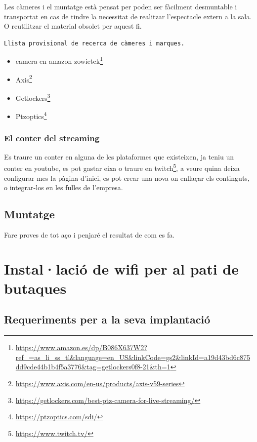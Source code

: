 \documentclass[
  10pt,
]{krantz}
\DeclareRobustCommand{\href}[2]{#2\footnote{\url{#1}}}
\begin{document}
Les càmeres i el muntatge està pensat per poden ser fàcilment desmuntable i transportat en cas de tindre la necessitat de realitzar l'espectacle extern a la sala. O reutilitzar el material obsolet per aquest fi.

\texttt{Llista\ provisional\ de\ recerca\ de\ càmeres\ i\ marques.}

\begin{itemize}
\item
  \href{https://www.amazon.es/dp/B086X637W2?ref_=as_li_ss_tl\&language=en_US\&linkCode=gs2\&linkId=a19d43bd6c875dd9cde44b1b4f5a3776\&tag=getlockers0f8-21\&th=1}{camera en amazon zowietek}
\item
  \href{https://www.axis.com/en-us/products/axis-v59-series}{Axis}
\item
  \href{https://getlockers.com/best-ptz-camera-for-live-streaming/}{Getlockers}
\item
  \href{https://ptzoptics.com/sdi/}{Ptzoptics}
\end{itemize}

\hypertarget{el-conter-del-streaming}{%
\subsection{El conter del streaming}\label{el-conter-del-streaming}}

Es traure un conter en alguna de les plataformes que existeixen, ja teniu un conter en youtube, es pot gastar eixa o traure en \href{https://www.twitch.tv/}{twitch}, a veure quina deixa configurar mes la pàgina d'inici, es pot crear una nova on enllaçar els continguts, o integrar-los en les fulles de l'empresa.

\hypertarget{muntatge}{%
\section{Muntatge}\label{muntatge}}

Fare proves de tot aço i penjaré el resultat de com es fa.

\hypertarget{installaciuxf3-de-wifi-per-al-pati-de-butaques}{%
\chapter{Instal·lació de wifi per al pati de butaques}\label{installaciuxf3-de-wifi-per-al-pati-de-butaques}}

\hypertarget{requeriments-per-a-la-seva-implantaciuxf3}{%
\section{Requeriments per a la seva implantació}\label{requeriments-per-a-la-seva-implantaciuxf3}}
\end{document}
